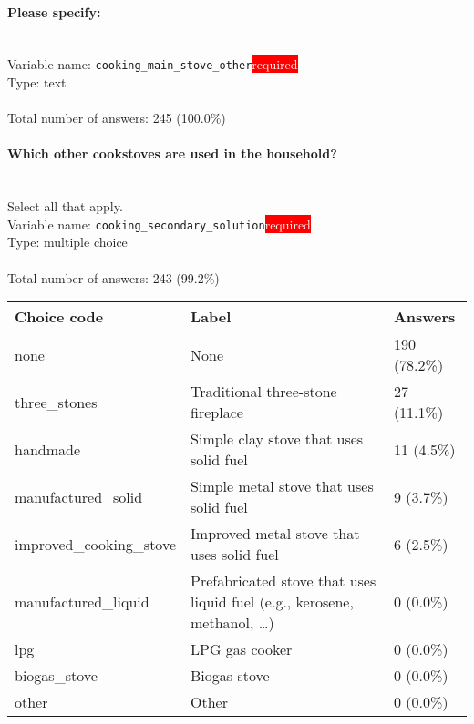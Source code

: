 \documentclass[11.5pt, a4paper]{scrartcl}
\begin{document}
\paragraph{Please specify:}
\  \\Variable name: \texttt{cooking\_main\_stove\_other}\hfill\colorbox{red}{\small{\textcolor{white}{required}}}\\
 Type: text\\
\\Total number of answers: 245 (100.0\%)
\\[0.2em]\paragraph{Which other cookstoves are used in the household?}
\ \\ {\small Select all that apply.}
\  \\Variable name: \texttt{cooking\_secondary\_solution}\hfill\colorbox{red}{\small{\textcolor{white}{required}}}\\
 Type: multiple choice\\
\\Total number of answers: 243 (99.2\%)
\\[0.2em] \begin{tabular}{p{4cm}|p{8cm}|p{3cm}}
Choice code & Label & Answers \\
\hline
none & None& \cellcolor{color3}190 (78.2\%)\\
\cellcolor{mygray} three\_stones & \cellcolor{mygray}Traditional three-stone fireplace & \cellcolor{color0}27 (11.1\%)\\
handmade & Simple clay stove that uses solid fuel& \cellcolor{color0}11 (4.5\%)\\
\cellcolor{mygray} manufactured\_solid & \cellcolor{mygray}Simple metal stove that uses solid fuel & \cellcolor{color0}9 (3.7\%)\\
improved\_cooking\_stove & Improved metal stove that uses solid fuel& \cellcolor{color0}6 (2.5\%)\\
\cellcolor{mygray} manufactured\_liquid & \cellcolor{mygray}Prefabricated stove that uses liquid fuel (e.g., kerosene, methanol, …) & \cellcolor{color0}0 (0.0\%)\\
lpg & LPG gas cooker& \cellcolor{color0}0 (0.0\%)\\
\cellcolor{mygray} biogas\_stove & \cellcolor{mygray}Biogas stove  & \cellcolor{color0}0 (0.0\%)\\
other & Other& \cellcolor{color0}0 (0.0\%)\\
\end{tabular}
\end{document}
